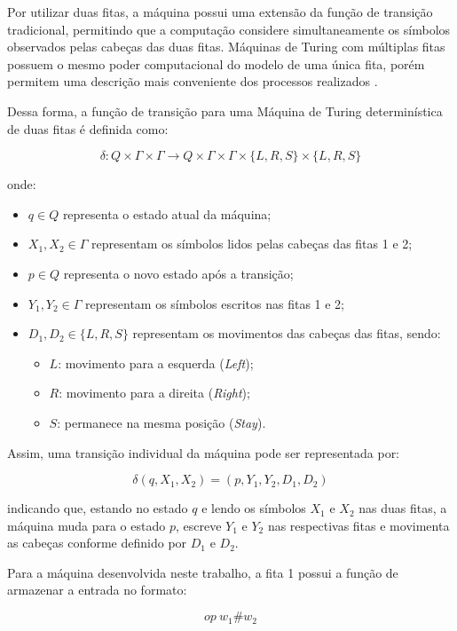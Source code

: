 \documentclass[report, 12pt]{uftreport}
\begin{document}
Por utilizar duas fitas, a máquina possui uma extensão da função de transição
tradicional, permitindo que a computação considere simultaneamente os símbolos
observados pelas cabeças das duas fitas. Máquinas de Turing com múltiplas fitas
possuem o mesmo poder computacional do modelo de uma única fita, porém permitem
uma descrição mais conveniente dos processos realizados
\cite{hopcroft}.

Dessa forma, a função de transição para uma Máquina de Turing determinística de
duas fitas é definida como:

\[
\delta: Q \times \Gamma \times \Gamma
\rightarrow
Q \times \Gamma \times \Gamma \times
\{L,R,S\} \times \{L,R,S\}
\]

onde:

\begin{itemize}
    \item $q \in Q$ representa o estado atual da máquina;
    \item $X_1,X_2 \in \Gamma$ representam os símbolos lidos pelas cabeças
    das fitas 1 e 2;
    \item $p \in Q$ representa o novo estado após a transição;
    \item $Y_1,Y_2 \in \Gamma$ representam os símbolos escritos nas fitas 1
    e 2;
    \item $D_1,D_2 \in \{L,R,S\}$ representam os movimentos das cabeças das
    fitas, sendo:
    \begin{itemize}
        \item $L$: movimento para a esquerda (\textit{Left});
        \item $R$: movimento para a direita (\textit{Right});
        \item $S$: permanece na mesma posição (\textit{Stay}).
    \end{itemize}
\end{itemize}

Assim, uma transição individual da máquina pode ser representada por:

\[
\delta(q,X_1,X_2)
=
(p,Y_1,Y_2,D_1,D_2)
\]

indicando que, estando no estado $q$ e lendo os símbolos $X_1$ e $X_2$ nas
duas fitas, a máquina muda para o estado $p$, escreve $Y_1$ e $Y_2$ nas
respectivas fitas e movimenta as cabeças conforme definido por $D_1$ e $D_2$.

Para a máquina desenvolvida neste trabalho, a fita 1 possui a função de
armazenar a entrada no formato:

\[
op\ w_1\#w_2
\]
\end{document}
